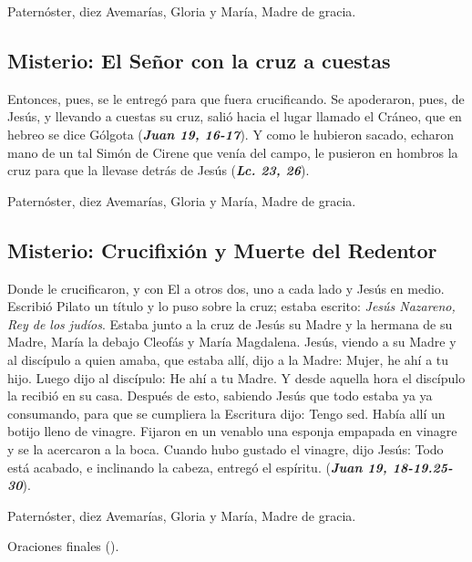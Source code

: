 \documentclass[./main.tex]{subfiles}
\newcounter{sorrowful-counter}
\begin{document}
\begin{center}
      Paternóster, diez Avemarías, Gloria y María, Madre de gracia.
\end{center}

\subsection*{ Misterio: El Señor con la cruz a cuestas}
Entonces, pues, se le entregó para que fuera crucificando. Se apoderaron, pues, de Jesús, y llevando a cuestas su cruz, salió hacia el lugar llamado el Cráneo, 
que en hebreo se dice Gólgota (\textbf{\emph{Juan 19, 16-17}}). Y como le hubieron sacado, echaron mano de un tal Simón de Cirene que venía del campo, 
le pusieron en hombros la cruz para que la llevase detrás de Jesús (\textbf{\emph{Lc. 23, 26}}).

\begin{center}
      Paternóster, diez Avemarías, Gloria y María, Madre de gracia.
\end{center}

\subsection*{ Misterio: Crucifixión y Muerte del Redentor}
Donde le crucificaron, y con El a otros dos, uno a cada lado y Jesús en medio. Escribió Pilato un título y lo puso sobre la cruz;
estaba escrito: \emph{Jesús Nazareno, Rey de los judíos}. Estaba junto a la cruz de Jesús su Madre y la hermana de su Madre, María la debajo
Cleofás y María Magdalena. Jesús, viendo a su Madre y al discípulo a quien amaba, que estaba allí, dijo a la Madre: Mujer, he ahí a tu hijo. Luego 
dijo al discípulo: He ahí a tu Madre. Y desde aquella hora el discípulo la recibió en su casa. Después de esto, sabiendo Jesús que todo estaba ya 
ya consumando, para que se cumpliera la Escritura dijo: Tengo sed. Había allí un botijo lleno de vinagre. Fijaron en un venablo una esponja empapada
en vinagre y se la acercaron a la boca. Cuando hubo gustado el vinagre, dijo Jesús: Todo está acabado, e inclinando la cabeza, entregó el espíritu. (\textbf{\emph{Juan 19, 18-19.25-30}}).

\begin{center}
      Paternóster, diez Avemarías, Gloria y María, Madre de gracia.
      
      Oraciones finales ().
\end{center}
\end{document}
